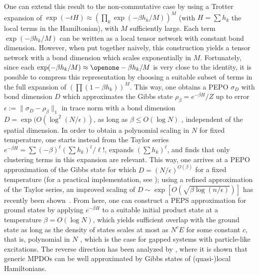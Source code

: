 \documentclass[rmp,aps,reprint,superscriptaddress,nobalancelastpage]{revtex4-1}
\begin{document}
One can extend this result to the non-commutative case by using a Trotter expansion
of  $\exp(-tH)\approx \left(\prod_k \exp(-\beta h_k/M)\right)^M$ (with $H=\sum h_k$ the local terms in the Hamiltonian), with $M$ sufficiently large. Each term $\exp(-\beta h_k/M)$ can be written as a local tensor network with constant bond dimension. However, when put together naively, this construction yields a tensor network with a bond dimension which scales exponentially in $M$.  Fortunately, since each $\exp(-\beta h_k/M)\approx \openone -\beta h_k/M$ is very close to the identity, it is possible to compress this representation by choosing a suitable subset of terms in the full expansion of $\left(\prod (1-\beta h_k)\right)^M$.  This way, one obtains a PEPO $\sigma_D$ with bond dimension $D$ which approximates the Gibbs state $\rho_\beta=e^{-\beta H}/Z$  up to error $\epsilon:=\|\sigma_D-\rho_\beta\|_1$ in trace norm with a bond dimension $D=\exp(O(\log^2(N/\epsilon))$, as long as $\beta\le O(\log N)$ \cite{molnar:thermal-peps}, independent of the spatial dimension.  In order to obtain a polynomial scaling in $N$ for fixed temperature, one starts instead from the Taylor series $e^{-\beta H}
    = \sum (-\beta)^\ell (\sum h_k)^\ell/\ell!$, expands $(\sum h_k)^\ell$, and finds that only clustering terms in this expansion are relevant.  This way, one arrives at a PEPO approximation of the Gibbs state for which $D=(N/\epsilon)^{O(\beta)}$ for a fixed temperature
\cite{hastings:locally,molnar:thermal-peps} (for a practical implementation, see \citet{vanhecke2019symmetric});
using a refined approximation of the Taylor series, an improved scaling of $D\sim\exp[O(\sqrt{\beta\log(n/\epsilon)})]$ has recently been shown~\cite{kuwahara:thermal-area-law}.
From here, one can construct a PEPS approximation for ground states by applying $e^{-\beta H}$ to a suitable initial product state at a temperature $\beta=O(\log N)$, which yields sufficient overlap with the ground state as long as the density of states scales at most as $N^cE$ for some constant $c$, that is, polynomial in $N$ \cite{hastings:locally}, which is the case for gapped systems with particle-like excitations. The reverse direction has been analyzed  by \citet{chen2020matrix}, where it is shown that generic MPDOs can be well approximated by Gibbs states of (quasi-)local Hamiltonians.
\end{document}
